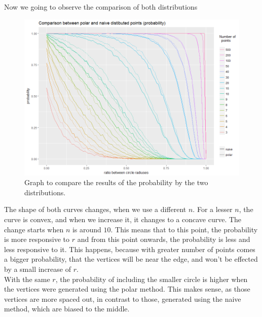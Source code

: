 \documentclass[12pt,a4paper]{article}
\begin{document}
Now we going to observe the comparison of both distributions
\begin{figure}[H]
\centering
\includegraphics[scale=0.63]{../graphs/graphs/probability_comparison_new.png}
\caption{Graph to compare the results of the probability by the two distributions.}
\label{f:comparison_probability}
\end{figure}

The shape of both curves changes, when we use a different $n$. For a lesser $n$, the curve is convex, and when we increase it, it changes to a concave curve. The change starts when $n$ is around $10$. This means that to this point, the probability is more responsive to $r$ and from this point onwards, the probability is less and less responsive to it. This happens, because with greater number of points comes a bigger probability, that the vertices will be near the edge, and won't be effected by a small increase of $r$.\\

With the same $r$, the probability of including the smaller circle is higher when the vertices were generated using the polar method. This makes sense, as those vertices are more spaced out, in contrast to those, generated using the naive method, which are biased to the middle.  \\
 
\end{document}
